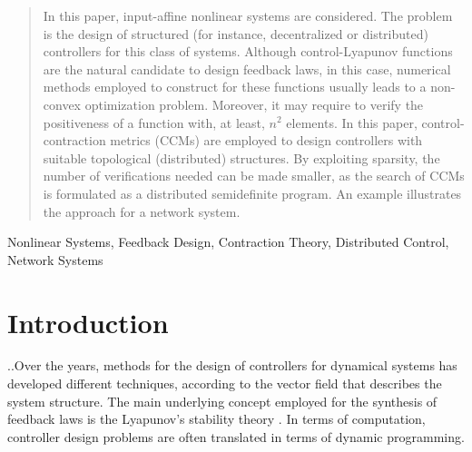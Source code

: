 \documentclass[10pt,twocolumn,twoside]{IEEEtran}
\newcounter{para}
\newcommand\mypara{\par \thesection.\refstepcounter{para}\thepara.\space}
\theoremstyle{plain}
\theoremstyle{definition}
\theoremstyle{remark}
\begin{document}
\maketitle

\begin{abstract}
In this paper, input-affine nonlinear systems are considered. The problem is the design of structured (for instance, decentralized or distributed) controllers for this class of systems. Although control-Lyapunov functions are the natural candidate to design feedback laws, in this case, numerical methods employed to construct for these functions usually leads to a non-convex optimization problem. Moreover, it may require to verify the positiveness of a function with, at least, $n^2$ elements. In this paper, control-contraction metrics (CCMs) are employed to design controllers with suitable topological (distributed) structures. By exploiting sparsity, the number of verifications needed can be made smaller, as the search of CCMs is formulated as a distributed semidefinite program. An example illustrates the approach for a network system.
\end{abstract}

\begin{IEEEkeywords}
Nonlinear Systems, Feedback Design, Contraction Theory, Distributed Control, Network Systems
\end{IEEEkeywords}






%
\IEEEpeerreviewmaketitle



\section{Introduction}

\mypara Over the years, methods for the design of controllers for dynamical systems has developed different techniques, according to the vector field that describes the system structure. The main underlying concept employed for the synthesis of feedback laws is the Lyapunov's stability theory \cite{Bhatia1970,Rouche:1977}. In terms of computation, controller design problems are often translated in terms of dynamic programming.
\end{document}
